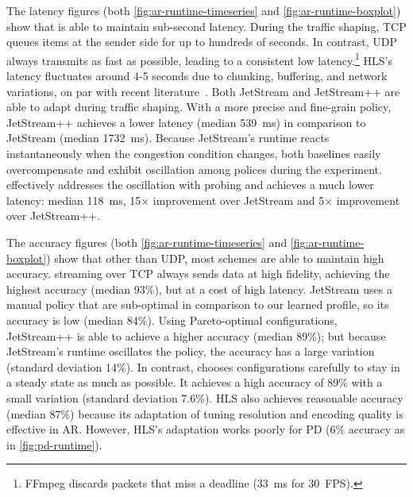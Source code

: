 The latency figures (both \autoref{fig:ar-runtime-timeseries} and
\autoref{fig:ar-runtime-boxplot}) show that \sysname{} is able to maintain
sub-second latency. During the traffic shaping, TCP queues items at the sender
side for up to hundreds of seconds. In contrast, UDP always transmits as fast as
possible, leading to a consistent low latency.\footnote{FFmpeg discards packets
  that miss a deadline (\SI{33}{\ms} for \SI{30}{FPS}).} HLS's latency
fluctuates around 4-5 seconds due to chunking, buffering, and network
variations, on par with recent literature~\cite{wang2016anatomy}. Both JetStream
and JetStream++ are able to adapt during traffic shaping. With a more precise
and fine-grain policy, JetStream++ achieves a lower latency (median
\SI{539}{\ms}) in comparison to JetStream (median \SI{1732}{\ms}). Because
JetStream's runtime reacts instantaneously when the congestion condition
changes, both baselines easily overcompensate and exhibit oscillation among
polices during the experiment. \sysname{} effectively addresses the oscillation
with probing and achieves a much lower latency: median \SI{118}{\ms}, 15$\times$
improvement over JetStream and 5$\times$ improvement over JetStream++.


The accuracy figures (both \autoref{fig:ar-runtime-timeseries} and
\autoref{fig:ar-runtime-boxplot}) show that other than UDP, most schemes are
able to maintain high accuracy. streaming over TCP always sends data at high
fidelity, achieving the highest accuracy (median 93\%), but at a cost of high
latency. JetStream uses a manual policy that are sub-optimal in comparison to
our learned profile, so its accuracy is low (median 84\%). Using Pareto-optimal
configurations, JetStream++ is able to achieve a higher accuracy (median 89\%);
but because JetStream's runtime oscillates the policy, the accuracy has a large
variation (standard deviation 14\%). In contrast, \sysname{} chooses
configurations carefully to stay in a steady state as much as possible.  It
achieves a high accuracy of 89\% with a small variation (standard deviation
7.6\%). HLS also achieves reasonable accuracy (median 87\%) because its
adaptation of tuning resolution and encoding quality is effective in
AR. However, HLS's adaptation works poorly for PD (6\% accuracy as in
\autoref{fig:pd-runtime}).


